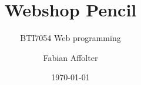 \documentclass[12pt]{beamer}
\title{Webshop Pencil}
\subtitle{BTI7054 Web programming}
\author{Fabian Affolter}
\institute[Bern University of Applied Sciences]
{
\medskip
{\emph{\href{mailto:affof1@bfh.ch}{affof1@bfh.ch}}}
}
\date{\today}
\begin{document}
%
\begin{frame}
\titlepage
\end{frame}
%
\begin{frame}
\frametitle{\\}
\tableofcontents
\end{frame}
%





%
\end{document}
